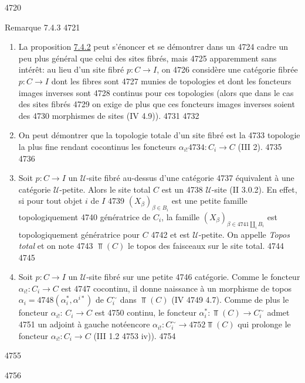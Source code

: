   4720	\begin{enonce*}[remark]{Remarque 7.4.3}
  4721	\begin{enumerate}
  4722	\renewcommand{\labelenumi}{\theenumi)}
  4723	\item La proposition \hyperref[VI.prop7.4.2]{7.4.2} peut s'énoncer et se démontrer dans un
  4724	  cadre un peu plus général que celui des sites fibrés, mais
  4725	  apparemment sans intérêt: au lieu d'un site fibré $p : C \to I$, on
  4726	  considère une catégorie fibrée $p : C \to I$ dont les fibres sont
  4727	  munies de topologies et dont les foncteurs images inverses sont
  4728	  continus pour ces topologies (alors que dans le cas des sites fibrés
  4729	  on exige de plus que ces foncteurs images inverses soient des
  4730	  morphismes de sites (IV 4.9)).
  4731	
  4732	\item On peut démontrer que la topologie totale d'un site fibré est la
  4733	  topologie la plus fine rendant cocontinus les foncteurs $\alpha_{i!}
  4734	  : C_i \to C$ (III 2).
  4735	
  4736	\item Soit $p : C \to I$ un $𝒰$-site fibré au-dessus d'une catégorie
  4737	  équivalent à une catégorie $𝒰$-petite. Alors le site total $C$ est un
  4738	  $𝒰$-site (II 3.0.2). En effet, si pour tout objet $i$ de $I$
  4739	  $(X_{\beta})_{\beta \in B_i}$ est une petite famille topologiquement
  4740	  génératrice de $C_i$, la famille $(X_{\beta})_{\beta \in
  4741	  \amalg_{i}B_i}$ est topologiquement génératrice pour $C$
  4742	  et est $𝒰$-petite. On appelle \emph{Topos total} et on note
  4743	  $\Top(C)$ le topos des faisceaux sur le site total.
  4744	
  4745	\item Soit $p : C \to I$ un $𝒰$-site fibré sur une petite
  4746	  catégorie. Comme le foncteur $\alpha_{i!} : C_i \to C$ est
  4747	  cocontinu, il donne naissance à un morphisme de topos $\alpha_i =
  4748	  (\alpha^{\ast}_i, \alpha^{i\ast})$ de $C^{\sim}_i$ dans $\Top(C)$ (IV
  4749	  4.7). Comme de plus le foncteur $\alpha_{i!}$: $C_i \to C$ est
  4750	  continu, le foncteur $\alpha^{\ast}_i : \Top(C) \to C^{\sim}_i$ admet
  4751	  un adjoint à gauche noté\pageoriginale encore $\alpha_{i!} : C^{\sim}_i \to
  4752	  \Top(C)$ qui prolonge le foncteur $\alpha_{i!} : C_i \to C$ (III 1.2
  4753	  iv)).
  4754	\end{enumerate}
  4755	\end{enonce*}
  4756	
